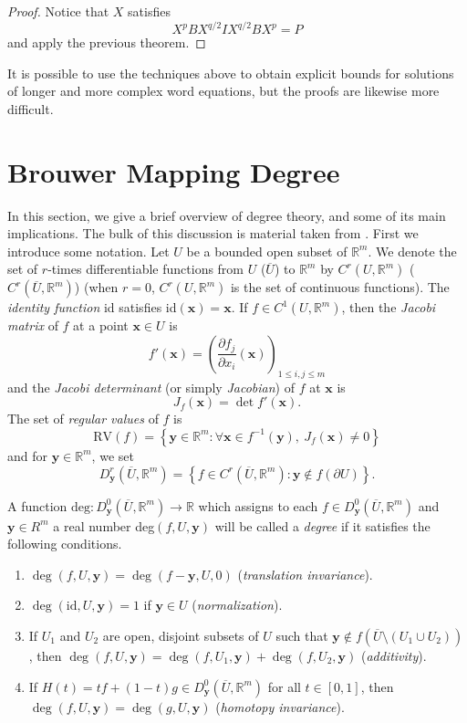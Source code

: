 \documentclass{amsart}
\theoremstyle{definition}
\theoremstyle{remark}
\numberwithin{equation}{section}
\newcommand{\<}{\langle}
\renewcommand{\>}{\rangle}
\begin{document}
\begin{proof}
Notice that $X$ satisfies
\[ X^p B X^{q/2} I X^{q/2} B X^p = P \]
and apply the previous theorem.
\end{proof}

It is possible to use the techniques above to obtain explicit
bounds for solutions of longer and more complex word equations, but
the proofs are likewise more difficult.


\section{Brouwer Mapping Degree}

In this section, we give a brief overview of degree theory, and
some of its main implications.  The bulk of this discussion is material taken from \cite{degthy, teschl}.  First we introduce some notation.  Let $U$ be a bounded open subset of $\mathbb R^m$.  We denote the set of $r$-times differentiable functions from $U$ ($\overline{U}$) to $\mathbb R^m$ by $C^r(U,\mathbb R^m)$ ($C^r(\overline{U},\mathbb R^m)$) (when $r = 0$, $C^r(U,\mathbb R^m)$ is the set of continuous functions).  The \textit{identity function} id satisfies id$(\mathbf x) = \mathbf x$.  If $f \in C^1(U,\mathbb R^m)$, then the \textit{Jacobi matrix} of $f$ at a point $\mathbf {x} \in U$ is \[f'(\mathbf {x}) = \left(  \frac{\partial f_j}{\partial x_i}(\mathbf{x}) \right)_{1\leq i,j \leq m}\] and the \textit{Jacobi determinant} (or simply \textit{Jacobian}) of $f$ at $\mathbf{x}$ is \[ J_f(\mathbf{x}) = \det f'(\mathbf{x}).\]  The set of \textit{regular values} of $f$ is \[\text{RV}(f) = \left\{\mathbf{y}\in \mathbb R^m : \forall \mathbf{x} \in f^{-1}(\mathbf{y}), \ J_f(\mathbf{x}) \neq 0\right\}\] and for $\mathbf{y} \in \mathbb R^m$, we set \[D^r_{\mathbf{y}}(\overline{U},\mathbb R^m) = \left\{ f \in C^r( \overline{U},\mathbb R^m) : \mathbf{y} \notin f(\partial U) \right\} .\]  

A function $\text{deg}: D^{0}_{\mathbf{y}}(\overline{U},\mathbb R^m) \to \mathbb R$ which assigns to each $f \in D^{0}_{\mathbf{y}}(\overline{U},\mathbb R^m)$ and $\mathbf{y} \in R^m$ a real number deg$(f,U,\mathbf{y})$ will be called a \textit{degree} if it satisfies the following conditions.


\begin{enumerate}
\item $\deg(f,U,\mathbf{y}) = \deg(f-\mathbf y, U, 0)$ (\textit{translation invariance}).
\item $\deg(\mathrm{id}, U, \mathbf y) = 1$ if $\mathbf y \in U$ (\textit{normalization}).
\item If $U_1$ and $U_2$ are open, disjoint subsets of $U$ such that $\mathbf  y \notin f(\overline{U} \setminus (U_1 \cup U_2))$, then $\deg(f,U,\mathbf y) = \deg(f,U_1,\mathbf y) +\deg(f,U_2,\mathbf y)$ (\textit{additivity}). 
\item If $H(t) = tf + (1-t)g \in D^{0}_{\mathbf{y}}(\overline{U},\mathbb R^m)$ for all $t \in [0,1]$, then $\deg(f,U,\mathbf y) = \deg(g,U,\mathbf y)$ (\textit{homotopy invariance}).
\end{enumerate}
\end{document}
